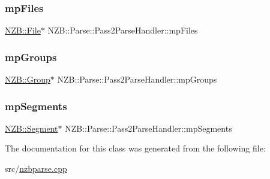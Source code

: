 \hypertarget{class_n_z_b_1_1_parse_1_1_pass2_parse_handler_aed1cb652f2f9f66446634b487c88f2d0}{}\label{class_n_z_b_1_1_parse_1_1_pass2_parse_handler_aed1cb652f2f9f66446634b487c88f2d0} 
\subsubsection{\texorpdfstring{mp\+Files}{mpFiles}}
{\footnotesize\ttfamily \hyperlink{class_n_z_b_1_1_file}{N\+Z\+B\+::\+File}$\ast$ N\+Z\+B\+::\+Parse\+::\+Pass2\+Parse\+Handler\+::mp\+Files\hspace{0.3cm}{\ttfamily [protected]}}

\hypertarget{class_n_z_b_1_1_parse_1_1_pass2_parse_handler_a04f7ef1c4c7547c15c49d81e7c404f85}{}\label{class_n_z_b_1_1_parse_1_1_pass2_parse_handler_a04f7ef1c4c7547c15c49d81e7c404f85} 
\subsubsection{\texorpdfstring{mp\+Groups}{mpGroups}}
{\footnotesize\ttfamily \hyperlink{class_n_z_b_1_1_group}{N\+Z\+B\+::\+Group}$\ast$ N\+Z\+B\+::\+Parse\+::\+Pass2\+Parse\+Handler\+::mp\+Groups\hspace{0.3cm}{\ttfamily [protected]}}

\hypertarget{class_n_z_b_1_1_parse_1_1_pass2_parse_handler_af89a59538b17bf8b840e71c95c97f810}{}\label{class_n_z_b_1_1_parse_1_1_pass2_parse_handler_af89a59538b17bf8b840e71c95c97f810} 
\subsubsection{\texorpdfstring{mp\+Segments}{mpSegments}}
{\footnotesize\ttfamily \hyperlink{class_n_z_b_1_1_segment}{N\+Z\+B\+::\+Segment}$\ast$ N\+Z\+B\+::\+Parse\+::\+Pass2\+Parse\+Handler\+::mp\+Segments\hspace{0.3cm}{\ttfamily [protected]}}



The documentation for this class was generated from the following file\+:\begin{DoxyCompactItemize}
\item 
src/\hyperlink{nzbparse_8cpp}{nzbparse.\+cpp}\end{DoxyCompactItemize}

